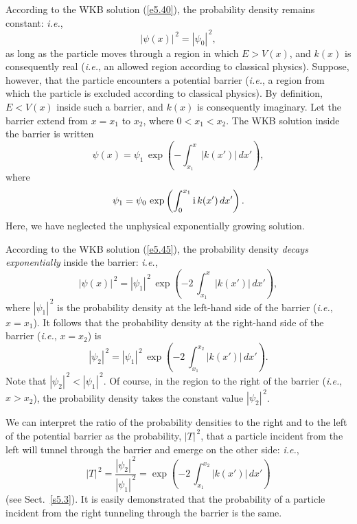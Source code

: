 According to the WKB solution (\ref{e5.40}),  the probability
density remains constant: {\em i.e.}, 
\begin{equation}
|\psi(x)|^{\,2} = |\psi_0|^{\,2},
\end{equation}
as long as the particle
moves through a region in which $E>V(x)$, and $k(x)$ is consequently real ({\em i.e.}, an allowed region
 according to classical physics).
Suppose, however, that the particle encounters a potential barrier ({\em i.e.}, a region from which the particle is excluded according to classical
physics). By definition, $E<V(x)$ inside such a barrier, and
$k(x)$ is consequently imaginary. Let the barrier extend from $x=x_1$ to $x_2$, where
$0<x_1<x_2$. The WKB solution inside the barrier is written
\begin{equation}\label{e5.45}
\psi(x) = \psi_1\,\exp\left(-\int_{x_1}^x |k(x')|\,dx'\right),
\end{equation}
where
\begin{equation}
\psi_1=\psi_0\,\exp\left(\int_0^{x_1}{\rm i}\,k(x')\,dx'\right).
\end{equation}
Here, we have neglected the unphysical exponentially growing solution.

According to the WKB solution (\ref{e5.45}), the probability
density {\em decays exponentially}\/ inside the barrier: {\em i.e.}, 
\begin{equation}
|\psi(x)|^{\,2} = |\psi_1|^{\,2}\,\exp\left(-2\,\int_{x_1}^x |k(x')|\,dx'\right),
\end{equation}
where $|\psi_1|^{\,2}$ is the probability density at the left-hand
side of the barrier ({\em i.e.}, $x=x_1$). It follows that the
probability density at the right-hand side of the barrier ({\em i.e.}, $x=x_2$) is
\begin{equation}
|\psi_2|^{\,2} = |\psi_1|^{\,2}\,\exp\left(-2\,\int_{x_1}^{x_2} |k(x')|\,dx'\right).
\end{equation}
Note that $|\psi_2|^{\,2} < |\psi_1|^{\,2}$. Of course, in the region to the right of the
barrier ({\em i.e.}, $x>x_2$), the probability density takes the
constant value $|\psi_2|^{\,2}$. 

We can interpret the ratio of the probability densities to the right and to the left  of the potential barrier as the probability, $|T|^{\,2}$, that a particle
incident from the left will tunnel through the barrier and
emerge on the other side: {\em i.e.},
\begin{equation}\label{e5.49}
|T|^{\,2} = \frac{|\psi_2|^{\,2}}{|\psi_1|^{\,2}} = \exp\left(-2\,\int_{x_1}^{x_2} |k(x')|\,dx'\right)
\end{equation}
(see Sect.~\ref{s5.3}).
It is easily demonstrated that the probability of a particle incident from the
right  tunneling through the barrier is the same.

